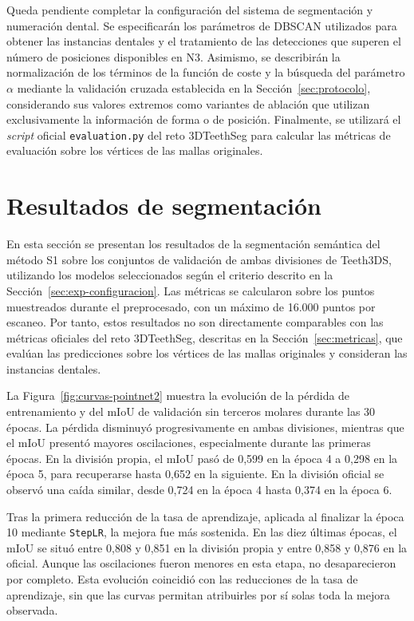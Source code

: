 Queda pendiente completar la configuración del sistema de segmentación y numeración dental. Se especificarán los parámetros de DBSCAN utilizados para obtener las instancias dentales y el tratamiento de las detecciones que superen el número de posiciones disponibles en N3. Asimismo, se describirán la normalización de los términos de la función de coste y la búsqueda del parámetro $\alpha$ mediante la validación cruzada establecida en la Sección~\ref{sec:protocolo}, considerando sus valores extremos como variantes de ablación que utilizan exclusivamente la información de forma o de posición. Finalmente, se utilizará el \textit{script} oficial \texttt{evaluation.py} del reto 3DTeethSeg para calcular las métricas de evaluación sobre los vértices de las mallas originales.

\section{Resultados de segmentación}
\label{sec:exp-segmentacion}

En esta sección se presentan los resultados de la segmentación semántica del método S1 sobre los conjuntos de validación de ambas divisiones de Teeth3DS, utilizando los modelos seleccionados según el criterio descrito en la Sección~\ref{sec:exp-configuracion}. Las métricas se calcularon sobre los puntos muestreados durante el preprocesado, con un máximo de 16.000 puntos por escaneo. Por tanto, estos resultados no son directamente comparables con las métricas oficiales del reto 3DTeethSeg, descritas en la Sección~\ref{sec:metricas}, que evalúan las predicciones sobre los vértices de las mallas originales y consideran las instancias dentales.

La Figura~\ref{fig:curvas-pointnet2} muestra la evolución de la pérdida de entrenamiento y del mIoU de validación sin terceros molares durante las 30 épocas. La pérdida disminuyó progresivamente en ambas divisiones, mientras que el mIoU presentó mayores oscilaciones, especialmente durante las primeras épocas. En la división propia, el mIoU pasó de 0{,}599 en la época 4 a 0{,}298 en la época 5, para recuperarse hasta 0{,}652 en la siguiente. En la división oficial se observó una caída similar, desde 0{,}724 en la época 4 hasta 0{,}374 en la época 6.

Tras la primera reducción de la tasa de aprendizaje, aplicada al finalizar la época 10 mediante \texttt{StepLR}, la mejora fue más sostenida. En las diez últimas épocas, el mIoU se situó entre 0{,}808 y 0{,}851 en la división propia y entre 0{,}858 y 0{,}876 en la oficial. Aunque las oscilaciones fueron menores en esta etapa, no desaparecieron por completo. Esta evolución coincidió con las reducciones de la tasa de aprendizaje, sin que las curvas permitan atribuirles por sí solas toda la mejora observada.

